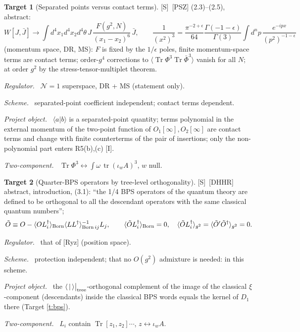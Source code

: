 \documentclass[11pt]{article}
\theoremstyle{definition}
\newtheorem{target}{Target}
\newcommand{\Tr}{\operatorname{Tr}}
\newcommand{\tr}{\operatorname{tr}}
\newcommand{\Sl}{\textup{[S]}}
\newcommand{\Il}{\textup{[I]}}
\newcommand{\tree}{\big|_{\rm tree}}
\newcommand{\fld}[1]{\par\textit{#1.}\ }
\begin{document}
\begin{target}[Separated points versus contact terms]\label{t:psz}
\Sl\ [PSZ] (2.3)--(2.5), abstract:
\[
W[J,\bar J]\to\int d^4x_1d^4x_2d^4\theta\,J\,\frac{F(g^2,N)}{(x_1-x_2)^6}\,\bar J,\qquad \frac1{(x^2)^3}=\frac{\pi^{-2+\epsilon}}{64}\frac{\Gamma(-1-\epsilon)}{\Gamma(3)}\int d^np\,\frac{e^{-ipx}}{(p^2)^{-1-\epsilon}}
\]
(momentum space, DR, MS): $F$ is fixed by the $1/\epsilon$ poles, finite momentum-space terms are contact terms; order-$g^4$ corrections to $\langle\Tr\Phi^3\Tr\bar\Phi^3\rangle$ vanish for all $N$; at order $g^2$ by the stress-tensor-multiplet theorem.
\fld{Regulator} $\mathcal N=1$ superspace, DR + MS (statement only).
\fld{Scheme} separated-point coefficient independent; contact terms dependent.
\fld{Project object} $\langle a|b\rangle$ is a separated-point quantity; terms polynomial in the external momentum of the two-point function of $O_1[\infty],O_2[\infty]$ are contact terms and change with finite counterterms of the pair of insertions; only the non-polynomial part enters R5(b),(c) \Il.
\fld{Two-component} $\Tr\Phi^3\leftrightarrow\int\omega\,\tr(\iota_wA)^3$, $w$ null.
\end{target}

\begin{target}[Quarter-BPS operators by tree-level orthogonality]\label{t:dhhr}
\Sl\ [DHHR] abstract, introduction, (3.1): ``the 1/4 BPS operators of the quantum theory are defined to be orthogonal to all the descendant operators with the same classical quantum numbers'';
\[
\tilde O\equiv O-\langle OL_i^\dagger\rangle_{\rm Born}\langle LL^\dagger\rangle^{-1}_{{\rm Born}\,ij}L_j,\qquad\langle\tilde OL_i^\dagger\rangle_{\rm Born}=0,\quad\langle\tilde OL_i^\dagger\rangle_{g^2}=\langle\tilde O'\tilde O^\dagger\rangle_{g^2}=0 .
\]
\fld{Regulator} that of [Ryz] (position space).
\fld{Scheme} protection independent; that no $O(g^2)$ admixture is needed: in this scheme.
\fld{Project object} the $\langle\,|\,\rangle\tree$-orthogonal complement of the image of the classical $\xi$-component (descendants) inside the classical BPS words equals the kernel of $D_1$ there (Target \ref{t:bps}).
\fld{Two-component} $L_i$ contain $\Tr[z_1,z_2]\cdots$, $z\leftrightarrow\iota_wA$.
\end{target}
\end{document}
